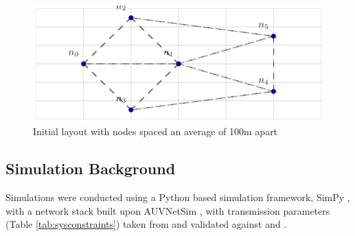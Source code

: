 \documentclass[conference]{IEEEtran}
\begin{document}
%
\begin{figure}[h]
  \centering
  \includegraphics[width=.45\textwidth]{img/s1_layout}
  \caption{Initial layout with nodes spaced an average of 100m apart}
  \label{fig:s1_layout}
\end{figure}
%

\subsection{Simulation Background}

Simulations were conducted using a Python based simulation framework, SimPy \cite{Mueller2003SimPy}, with a network stack built upon AUVNetSim \cite{Miquel2008}, with transmission parameters (Table \ref{tab:sysconstraints}) taken from and validated against \cite{Stojanovic2007} and \cite{Stefanov2011}.
\end{document}
